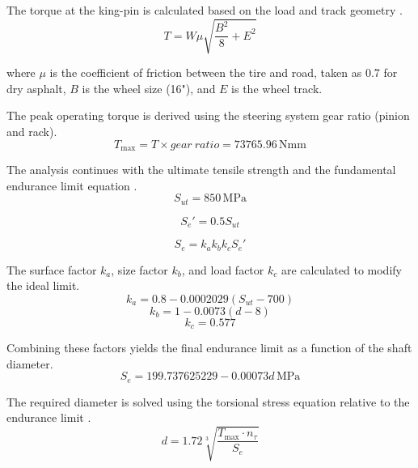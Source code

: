 The torque at the king-pin is calculated based on the load and track geometry \parencite{agrawal2016design}.
\begin{equation}
    T = W \mu \sqrt{\frac{B^2}{8} + E^2}
\end{equation}

where $\mu$ is the coefficient of friction between the tire and road, taken as 0.7 for dry asphalt, $B$ is the wheel size (16"), and $E$ is the wheel track.

The peak operating torque is derived using the steering system gear ratio (pinion and rack).
\begin{equation}
    T_{\max} = T \times gear\ ratio = 73765.96\, \mathrm{Nmm}
\end{equation}

The analysis continues with the ultimate tensile strength and the fundamental endurance limit equation \parencite{basics-mechanical-engineering}.
\begin{equation}
    S_{ut} = 850 \, \mathrm{MPa}
\end{equation}

\begin{equation}
    S_e' = 0.5 S_{ut}
\end{equation}

\begin{equation}
    S_e = k_a k_b k_c S_e'
\end{equation}

The surface factor $k_a$, size factor $k_b$, and load factor $k_c$ are calculated to modify the ideal limit.
\begin{equation}
    k_a = 0.8 - 0.0002029(S_{ut} - 700)
\end{equation}
\begin{equation}
    k_b = 1 - 0.0073(d - 8)
\end{equation}
\begin{equation}
    k_c = 0.577
\end{equation}

Combining these factors yields the final endurance limit as a function of the shaft diameter.
\begin{equation}
    S_e = 199.737625229 - 0.00073d \, \mathrm{MPa}
\end{equation}

The required diameter is solved using the torsional stress equation relative to the endurance limit \parencite{basics-mechanical-engineering}.
\begin{equation}
    d = 1.72 \sqrt[3]{\frac{T_{\max} \cdot n_{\tau}}{S_e}}
\end{equation}

